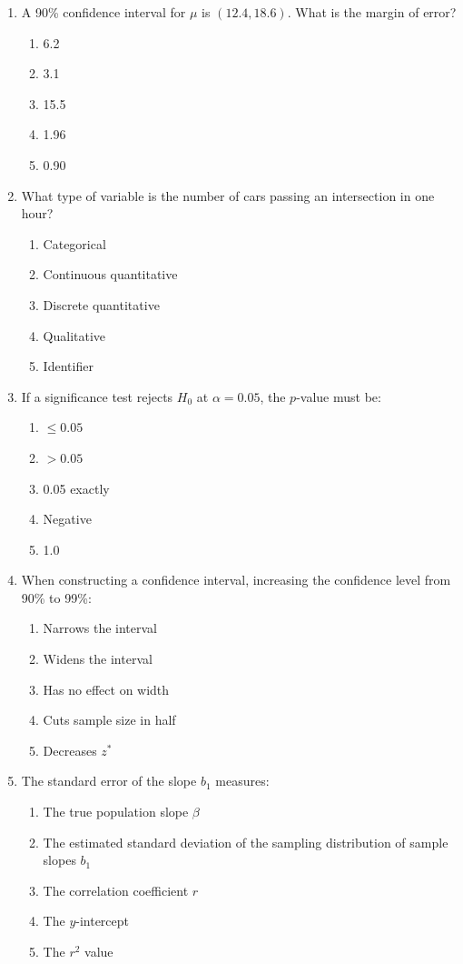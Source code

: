 \begin{enumerate}[resume, leftmargin=1.5em]
  \item A 90\% confidence interval for $\mu$ is $(12.4, 18.6)$. What is the margin of error?
  \begin{enumerate}[label=(\Alph*)]
    \item 6.2 \item 3.1 \item 15.5 \item 1.96 \item 0.90
  \end{enumerate}

  \item What type of variable is the number of cars passing an intersection in one hour?
  \begin{enumerate}[label=(\Alph*)]
    \item Categorical \item Continuous quantitative \item Discrete quantitative \item Qualitative \item Identifier
  \end{enumerate}

  \item If a significance test rejects $H_0$ at $\alpha = 0.05$, the $p$-value must be:
  \begin{enumerate}[label=(\Alph*)]
    \item $\le 0.05$ \item $> 0.05$ \item 0.05 exactly \item Negative \item 1.0
  \end{enumerate}

  \item When constructing a confidence interval, increasing the confidence level from 90\% to 99\%:
  \begin{enumerate}[label=(\Alph*)]
    \item Narrows the interval \item Widens the interval \item Has no effect on width \item Cuts sample size in half \item Decreases $z^*$
  \end{enumerate}

  \item The standard error of the slope $b_1$ measures:
  \begin{enumerate}[label=(\Alph*)]
    \item The true population slope $\beta$
    \item The estimated standard deviation of the sampling distribution of sample slopes $b_1$
    \item The correlation coefficient $r$
    \item The $y$-intercept
    \item The $r^2$ value
  \end{enumerate}


\end{enumerate}
